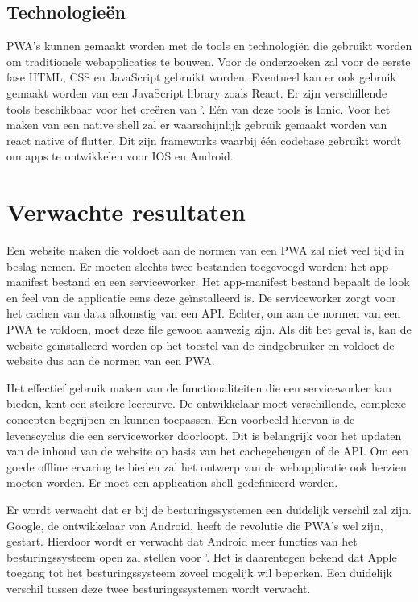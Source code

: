 \subsection{Technologieën}

PWA's kunnen gemaakt worden met de tools en technologiën die gebruikt worden om traditionele webapplicaties te bouwen. 
Voor de onderzoeken zal voor de eerste fase HTML, CSS en JavaScript gebruikt worden. Eventueel kan er ook gebruik gemaakt worden van een JavaScript library zoals React.
Er zijn verschillende tools beschikbaar voor het creëren van '. Eén van deze tools is Ionic.
Voor het maken van een native shell zal er waarschijnlijk gebruik gemaakt worden van react native of flutter. Dit zijn frameworks waarbij één codebase gebruikt wordt om apps te ontwikkelen voor IOS en Android.




\section{Verwachte resultaten}
\label{sec:verwachte_resultaten}


Een website maken die voldoet aan de normen van een PWA zal niet veel tijd in beslag nemen. Er moeten slechts twee bestanden toegevoegd worden: het app-manifest bestand en een serviceworker. Het app-manifest bestand bepaalt de look en feel van de applicatie eens deze geïnstalleerd is. 
De serviceworker zorgt voor het cachen van data afkomstig van een API. Echter, om aan de normen van een PWA te voldoen, moet deze file gewoon aanwezig zijn. 
Als dit het geval is, kan de website geïnstalleerd worden op het toestel van de eindgebruiker en voldoet de website dus aan de normen van een PWA.

Het effectief gebruik maken van de functionaliteiten die een serviceworker kan bieden, kent een steilere leercurve. De ontwikkelaar moet verschillende, complexe concepten begrijpen en kunnen toepassen. 
Een voorbeeld hiervan is de levenscyclus die een serviceworker doorloopt. Dit is belangrijk voor het updaten van de inhoud van de website op basis van het cachegeheugen of de API. 
Om een goede offline ervaring te bieden zal het ontwerp van de webapplicatie ook herzien moeten worden. Er moet een application shell gedefinieerd worden.
\autocite{Gaunt2019} \autocite{Osmani2016}

Er wordt verwacht dat er bij de besturingssystemen een duidelijk verschil zal zijn. 
Google, de ontwikkelaar van Android, heeft de revolutie die PWA's wel zijn, gestart.
Hierdoor wordt er verwacht dat Android meer functies van het besturingssysteem open zal stellen voor '.
Het is daarentegen bekend dat Apple toegang tot het besturingssysteem zoveel mogelijk wil beperken. Een duidelijk verschil tussen deze twee besturingssystemen wordt verwacht. 
\autocite{Hansen2017}




